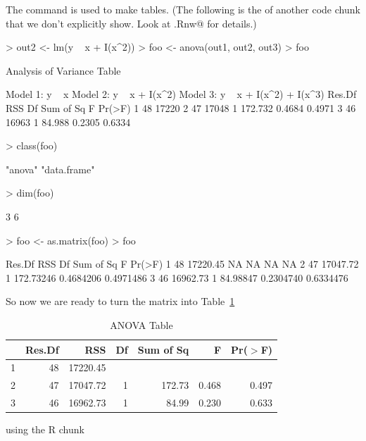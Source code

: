 \documentclass{article}
\begin{document}
The \verb@xtable@ command is used to make tables.  (The following
is the \verb@Sweave@ of another code chunk that we don't explicitly
show.  Look at \verb@foo.Rnw@ for details.)
\begin{Schunk}
\begin{Sinput}
> out2 <- lm(y ~ x + I(x^2))
> foo <- anova(out1, out2, out3)
> foo
\end{Sinput}
\begin{Soutput}
Analysis of Variance Table

Model 1: y ~ x
Model 2: y ~ x + I(x^2)
Model 3: y ~ x + I(x^2) + I(x^3)
  Res.Df   RSS Df Sum of Sq      F Pr(>F)
1     48 17220                           
2     47 17048  1   172.732 0.4684 0.4971
3     46 16963  1    84.988 0.2305 0.6334
\end{Soutput}
\begin{Sinput}
> class(foo)
\end{Sinput}
\begin{Soutput}
[1] "anova"      "data.frame"
\end{Soutput}
\begin{Sinput}
> dim(foo)
\end{Sinput}
\begin{Soutput}
[1] 3 6
\end{Soutput}
\begin{Sinput}
> foo <- as.matrix(foo)
> foo
\end{Sinput}
\begin{Soutput}
  Res.Df      RSS Df Sum of Sq         F    Pr(>F)
1     48 17220.45 NA        NA        NA        NA
2     47 17047.72  1 172.73246 0.4684206 0.4971486
3     46 16962.73  1  84.98847 0.2304740 0.6334476
\end{Soutput}
\end{Schunk}
So now we are ready to turn the matrix \verb@foo@
into Table~\ref{tab:one}
\begin{table}[tbp]
\begin{center}
\caption{ANOVA Table}
\label{tab:one}
\begin{tabular}{rrrrrrr}
  \hline
 & Res.Df & RSS & Df & Sum of Sq & F & Pr($>$F) \\ 
  \hline
1 & 48 & 17220.45 &  &  &  &  \\ 
  2 & 47 & 17047.72 & 1 & 172.73 & 0.468 & 0.497 \\ 
  3 & 46 & 16962.73 & 1 & 84.99 & 0.230 & 0.633 \\ 
   \hline
\end{tabular}
\end{center}
\end{table}using the R chunk
\end{document}
